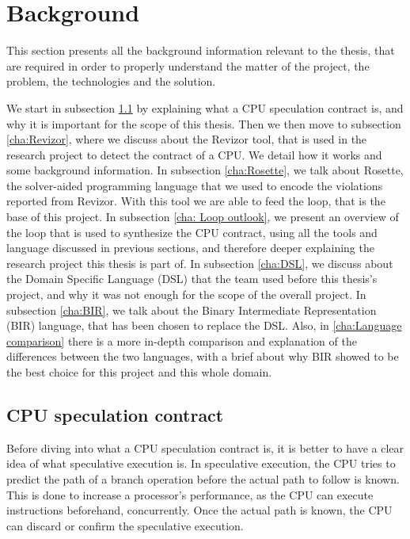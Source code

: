 \chapter{Background}
\label{cha:background}

This section presents all the background information relevant to the thesis, that
are required in order to properly understand the matter of the project, the
problem, the technologies and the solution.

We start in subsection \ref{cha:CPU speculation contract} by explaining what a CPU
speculation contract is, and why it is important for the scope of this thesis. Then
we then move to subsection \ref{cha:Revizor}, where we discuss about the Revizor
tool, that is used in the research project to detect the contract of a CPU. We
detail how it works and some background information. In subsection \ref{cha:Rosette},
we talk about Rosette, the solver-aided programming language that we used to encode
the violations reported from Revizor. With this tool we are able to feed the
loop, that is the base of this project. In subsection \ref{cha: Loop outlook}, we
present an overview of the loop that is used to synthesize the CPU contract,
using all the tools and language discussed in previous sections, and therefore deeper
explaining the research project this thesis is part of. In subsection
\ref{cha:DSL}, we discuss about the Domain Specific Language (DSL) that the team
used before this thesis's project, and why it was not enough for the scope of
the overall project. In subsection \ref{cha:BIR}, we talk about the Binary
Intermediate Representation (BIR) language, that has been chosen to replace the DSL.
Also, in \ref{cha:Language comparison} there is a more in-depth comparison and explanation
of the differences between the two languages, with a brief about why BIR showed
to be the best choice for this project and this whole domain.

\section{CPU speculation contract}
\label{cha:CPU speculation contract} Before diving into what a CPU speculation
contract is, it is better to have a clear idea of what speculative execution is.
In speculative execution, the CPU tries to predict the path of a branch operation
before the actual path to follow is known. This is done to increase a processor's
performance, as the CPU can execute instructions beforehand, concurrently. Once the
actual path is known, the CPU can discard or confirm the speculative execution.

